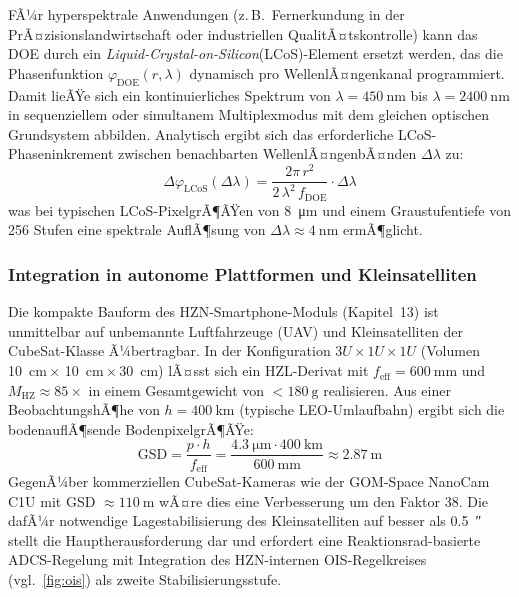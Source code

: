 ﻿\documentclass[12pt,a4paper]{article}
\theoremstyle{definition}
\newcommand{\HZ}{\mathrm{HZ}}
\newcommand{\eff}{\mathrm{eff}}
\newcommand{\DOE}{\mathrm{DOE}}
\begin{document}
	FÃ¼r hyperspektrale Anwendungen (z.\,B.\ Fernerkundung in der
	PrÃ¤zisionslandwirtschaft oder industriellen QualitÃ¤tskontrolle)
	kann das DOE durch ein \emph{Liquid-Crystal-on-Silicon}(LCoS)-Element
	ersetzt werden, das die Phasenfunktion $\varphi_\DOE(r, \lambda)$
	dynamisch pro WellenlÃ¤ngenkanal programmiert.  Damit lieÃŸe sich
	ein kontinuierliches Spektrum von $\lambda = \SI{450}{\nano\metre}$
	bis $\lambda = \SI{2400}{\nano\metre}$ in sequenziellem oder simultanem
	Multiplexmodus mit dem gleichen optischen Grundsystem abbilden.
	Analytisch ergibt sich das erforderliche LCoS-Phaseninkrement
	zwischen benachbarten WellenlÃ¤ngenbÃ¤nden $\Delta\lambda$ zu:
	\begin{equation}
		\Delta\varphi_\mathrm{LCoS}(\Delta\lambda)
		= \frac{2\pi\,r^2}{2\,\lambda^2\,f_\DOE}\cdot\Delta\lambda
		\label{eq:lcos_increment}
	\end{equation}
	was bei typischen LCoS-PixelgrÃ¶ÃŸen von \SI{8}{\micro\metre} und
	einem Graustufentiefe von 256 Stufen eine spektrale AuflÃ¶sung von
	$\Delta\lambda \approx \SI{4}{\nano\metre}$ ermÃ¶glicht.

	\subsubsection{Integration in autonome Plattformen und Kleinsatelliten}

	Die kompakte Bauform des HZN-Smartphone-Moduls (Kapitel~13) ist
	unmittelbar auf unbemannte Luftfahrzeuge (UAV) und Kleinsatelliten
	der CubeSat-Klasse Ã¼bertragbar.  In der Konfiguration
	$3U\times1U\times1U$ (Volumen \SI{10}{\centi\metre}\,$\times$
	\SI{10}{\centi\metre}\,$\times$\,\SI{30}{\centi\metre}) lÃ¤sst sich
	ein HZL-Derivat mit $f_\eff = \SI{600}{\milli\metre}$ und
	$M_\HZ \approx 85\times$ in einem Gesamtgewicht von
	$< \SI{180}{\gram}$ realisieren.  Aus einer
	BeobachtungshÃ¶he von $h = \SI{400}{\kilo\metre}$ (typische
	LEO-Umlaufbahn) ergibt sich die bodenauflÃ¶sende BodenpixelgrÃ¶ÃŸe:
	\begin{equation}
		\mathrm{GSD} = \frac{p \cdot h}{f_\eff}
		= \frac{\SI{4.3}{\micro\metre}\cdot\SI{400}{\kilo\metre}}
		{\SI{600}{\milli\metre}}
		\approx \SI{2.87}{\metre}
		\label{eq:gsd}
	\end{equation}
	GegenÃ¼ber kommerziellen CubeSat-Kameras wie der GOM-Space
	NanoCam C1U mit GSD $\approx \SI{110}{\metre}$ wÃ¤re dies eine
	Verbesserung um den Faktor 38.  Die dafÃ¼r notwendige
	Lagestabilisierung des Kleinsatelliten auf besser als
	\SI{0.5}{\arcsecond} stellt die Hauptherausforderung dar und
	erfordert eine Reaktionsrad-basierte ADCS-Regelung mit Integration
	des HZN-internen OIS-Regelkreises (vgl.\ \cref{fig:ois}) als
	zweite Stabilisierungsstufe.
\end{document}
